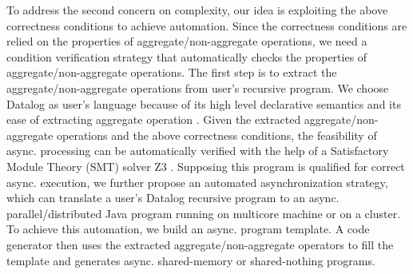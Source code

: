 
To address the second concern on complexity, our idea is exploiting the above correctness conditions to achieve automation. Since the correctness conditions are relied on the properties of aggregate/non-aggregate operations, we need a condition verification strategy that automatically checks the properties of aggregate/non-aggregate operations. The first step is to extract the aggregate/non-aggregate operations from user's recursive program. We choose Datalog \cite{} as user's language because of its high level declarative semantics and its ease of extracting aggregate operation \cite{Shkapsky:2016:BDA:2882903.2915229}. Given the extracted aggregate/non-aggregate operations and the above correctness conditions, the feasibility of async. processing can be automatically verified with the help of a Satisfactory Module Theory (SMT) solver Z3 \cite{DeMoura:2008:ZES:1792734.1792766}. Supposing this program is qualified for correct async. execution, we further propose an automated asynchronization strategy, which can translate a user's Datalog recursive program to an async. parallel/distributed Java program running on multicore machine or on a cluster. To achieve this automation, we build an async. program template. A code generator then uses the extracted aggregate/non-aggregate operators to fill the template and generates async. shared-memory or shared-nothing programs.



